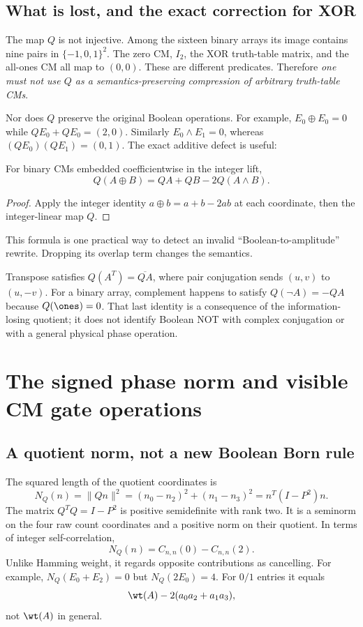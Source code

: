 \subsection{What is lost, and the exact correction for XOR}
The map $Q$ is not injective. Among the sixteen binary arrays its image contains nine pairs in $\{-1,0,1\}^2$. The zero CM, $I_2$, the XOR truth-table matrix, and the all-ones CM all map to $(0,0)$. These are different predicates. Therefore \emph{one must not use $Q$ as a semantics-preserving compression of arbitrary truth-table CMs}.

Nor does $Q$ preserve the original Boolean operations. For example, $E_0\oplus E_0=0$ while $QE_0+QE_0=(2,0)$. Similarly $E_0\land E_1=0$, whereas $(QE_0)(QE_1)=(0,1)$. The exact additive defect is useful:
\begin{proposition}\label{prop:carry}
For binary CMs embedded coefficientwise in the integer lift,
\begin{equation}\label{eq:carry}
 Q(A\oplus B)=QA+QB-2Q(A\land B).
\end{equation}
\end{proposition}
\begin{proof}
Apply the integer identity $a\oplus b=a+b-2ab$ at each coordinate, then the integer-linear map $Q$.
\end{proof}
This formula is one practical way to detect an invalid ``Boolean-to-amplitude'' rewrite. Dropping its overlap term changes the semantics.

Transpose satisfies $Q(A^T)=\overline{QA}$, where pair conjugation sends $(u,v)$ to $(u,-v)$. For a binary array, complement happens to satisfy $Q(\neg A)=-QA$ because $Q(\ones)=0$. That last identity is a consequence of the information-losing quotient; it does not identify Boolean NOT with complex conjugation or with a general physical phase operation.

\section{The signed phase norm and visible CM gate operations}\label{sec:normlift}
\subsection{A quotient norm, not a new Boolean Born rule}
The squared length of the quotient coordinates is
\begin{equation}\label{eq:normQ}
 N_Q(n)=\|Qn\|^2=(n_0-n_2)^2+(n_1-n_3)^2
       =n^T(I-P^2)n.
\end{equation}
The matrix $Q^TQ=I-P^2$ is positive semidefinite with rank two. It is a seminorm on the four raw count coordinates and a positive norm on their quotient. In terms of integer self-correlation,
\begin{equation}
 N_Q(n)=C_{n,n}(0)-C_{n,n}(2).
\end{equation}
Unlike Hamming weight, it regards opposite contributions as cancelling. For example, $N_Q(E_0+E_2)=0$ but $N_Q(2E_0)=4$. For $0/1$ entries it equals
\begin{equation}
 \wt(A)-2(a_0a_2+a_1a_3),
\end{equation}
not $\wt(A)$ in general.

